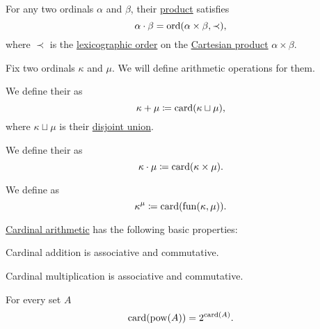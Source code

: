 \begin{proposition}\label{thm:ordinal_multiplication_disjoin_union}
  For any two ordinals \( \alpha \) and \( \beta \), their \hyperref[def:ordinal_arithmetic/multiplication]{product} satisfies
  \begin{equation*}
    \alpha \cdot \beta = \operatorname{ord}(\alpha \times \beta, \prec),
  \end{equation*}
  where \( \prec \) is the \hyperref[def:lexicographic_order]{lexicographic order} on the \hyperref[def:cartesian_product]{Cartesian product} \( \alpha \times \beta \).
\end{proposition}

\begin{definition}\label{def:cardinal_arithmetic}
  Fix two ordinals \( \kappa \) and \( \mu \). We will define arithmetic operations for them.

  \begin{thmenum}
     We define their  as
    \begin{equation*}
      \kappa + \mu \coloneqq \operatorname{card}(\kappa \sqcup \mu),
    \end{equation*}
    where \( \kappa \sqcup \mu \) is their \hyperref[def:disjoint_union]{disjoint union}.

     We define their  as
    \begin{equation*}
      \kappa \cdot \mu \coloneqq \operatorname{card}(\kappa \times \mu).
    \end{equation*}

     We define  as
    \begin{equation*}
      \kappa^\mu \coloneqq \operatorname{card}(\operatorname{fun}(\kappa, \mu)).
    \end{equation*}
  \end{thmenum}
\end{definition}

\begin{proposition}\label{thm:cardinal_arithmetic_properties}
  \hyperref[def:cardinal_arithmetic]{Cardinal arithmetic} has the following basic properties:

  \begin{thmenum}
     Cardinal addition is associative and commutative.

     Cardinal multiplication is associative and commutative.

     For every set \( A \)
    \begin{equation*}
      \operatorname{card}(\operatorname{pow}(A)) = 2^{\operatorname{card}(A)}.
    \end{equation*}
  \end{thmenum}
\end{proposition}
